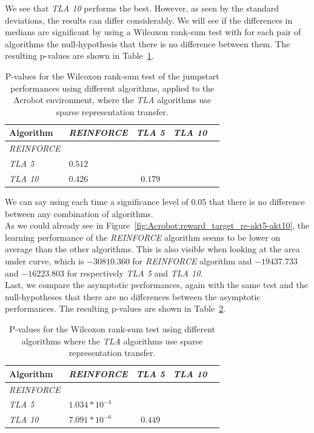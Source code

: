 We see that \textit{TLA 10} performs the best. However, as seen by the standard deviations, the results can differ considerably. We will see if the differences in medians are significant by using a Wilcoxon rank-sum test with for each pair of algorithms the null-hypothesis that there is no difference between them.
The resulting p-values are shown in Table~\ref{tab:sparse:pvalues}.
\begin{table}[htb]
    \centering
    \begin{tabular}{llccc}
    \hline
    Algorithm & \textit{REINFORCE} & \textit{TLA 5} & \textit{TLA 10} \\
    \hline
       \textit{REINFORCE}  & & & \\
       \textit{TLA 5} & $0.512$ & & \\
       \textit{TLA 10} & $0.426$ & $0.179$ & \\
    \hline
    \end{tabular}
    \caption{P-values for the Wilcoxon rank-sum test of the jumpstart performances using different algorithms, applied to the Acrobot environment, where the \textit{TLA} algorithms use sparse representation transfer.}
    \label{tab:sparse:pvalues}
\end{table}
We can say using each time a significance level of $0.05$ that there is no difference between any combination of algorithms.\\

As we could already see in Figure~\ref{fig:Acrobot:reward_target_re-akt5-akt10}, the learning performance of the \textit{REINFORCE} algorithm seems to be lower on average than the other algorithms.
This is also visible when looking at the area under curve, which is $-30810.360$ for \textit{REINFORCE} algorithm and $-19437.733$ and $-16223.803$ for respectively \textit{TLA 5} and \textit{TLA 10}.\\

Last, we compare the asymptotic performances, again with the same test and the null-hypotheses that there are no differences between the asymptotic performances. The resulting p-values are shown in Table~\ref{tab:sparse:asymp:pvalues}.
\begin{table}[htb]
    \centering
    \begin{tabular}{llccc}
    \hline
    Algorithm & \textit{REINFORCE} & \textit{TLA 5} & \textit{TLA 10} \\
    \hline
       \textit{REINFORCE}  & & & \\
       \textit{TLA 5} & $1.034*10^{-4}$ & & \\
       \textit{TLA 10} & $7.091*10^{-6}$ & $0.449$ & \\
    \hline
    \end{tabular}
    \caption{P-values for the Wilcoxon rank-sum test using different algorithms where the \textit{TLA} algorithms use sparse representation transfer.}
    \label{tab:sparse:asymp:pvalues}
\end{table}

